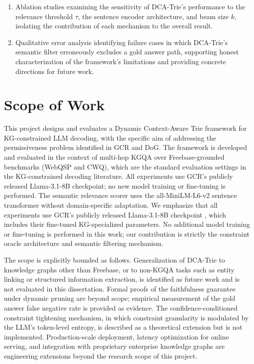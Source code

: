 \begin{enumerate}[label=\roman*.]
  \item Ablation studies examining the sensitivity of DCA-Trie's performance to the relevance threshold $\tau$, the sentence encoder architecture, and beam size $k$, isolating the contribution of each mechanism to the overall result.
  \item Qualitative error analysis identifying failure cases in which DCA-Trie's semantic filter erroneously excludes a gold answer path, supporting honest characterization of the framework's limitations and providing concrete directions for future work.
\end{enumerate}

\section{Scope of Work}

This project designs and evaluates a Dynamic Context-Aware Trie framework for KG-constrained LLM decoding, with the specific aim of addressing the permissiveness problem identified in GCR and DoG. The framework is developed and evaluated in the context of multi-hop KGQA over Freebase-grounded benchmarks (WebQSP and CWQ), which are the standard evaluation settings in the KG-constrained decoding literature. All experiments use GCR's publicly released Llama-3.1-8B checkpoint; no new model training or fine-tuning is performed. The semantic relevance scorer uses the all-MiniLM-L6-v2 sentence transformer without domain-specific adaptation.
We emphasize that all experiments use GCR's publicly released Llama-3.1-8B checkpoint \citep{luo2025-graph-constrained-reasoning}, which includes their fine-tuned KG-specialized parameters. No additional model training or fine-tuning is performed in this work; our contribution is strictly the constraint oracle architecture and semantic filtering mechanism.

The scope is explicitly bounded as follows. Generalization of DCA-Trie to knowledge graphs other than Freebase, or to non-KGQA tasks such as entity linking or structured information extraction, is identified as future work and is not evaluated in this dissertation. Formal proofs of the faithfulness guarantee under dynamic pruning are beyond scope; empirical measurement of the gold answer false negative rate is provided as evidence. The confidence-conditioned constraint tightening mechanism, in which constraint granularity is modulated by the LLM's token-level entropy, is described as a theoretical extension but is not implemented. Production-scale deployment, latency optimization for online serving, and integration with proprietary enterprise knowledge graphs are engineering extensions beyond the research scope of this project.

